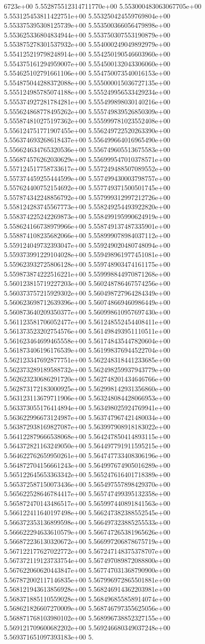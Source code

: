 6723e+00	5.552875512314711770e+00	5.553000483063067705e+00	5.553125453811422751e+00	5.553250424559769804e+00	5.553375395308125739e+00	5.553500366056479898e+00	5.553625336804834944e+00	5.553750307553190879e+00	5.553875278301537932e+00	5.554000249049892979e+00	5.554125219798248914e+00	5.554250190546603960e+00	5.554375161294959007e+00	5.554500132043306060e+00	5.554625102791661106e+00	5.554750073540016153e+00	5.554875044288372088e+00	5.555000015036727135e+00	5.555124985785074188e+00	5.555249956533429234e+00	5.555374927281784281e+00	5.555499898030140216e+00	5.555624868778495262e+00	5.555749839526850309e+00	5.555874810275197362e+00	5.555999781023552408e+00	5.556124751771907455e+00	5.556249722520263390e+00	5.556374693268618437e+00	5.556499664016965490e+00	5.556624634765320536e+00	5.556749605513675583e+00	5.556874576262030629e+00	5.556999547010378571e+00	5.557124517758733617e+00	5.557249488507089552e+00	5.557374459255444599e+00	5.557499430003798757e+00	5.557624400752154692e+00	5.557749371500501745e+00	5.557874342248856792e+00	5.557999312997212726e+00	5.558124283745567773e+00	5.558249254493922820e+00	5.558374225242269873e+00	5.558499195990624919e+00	5.558624166738979966e+00	5.558749137487335901e+00	5.558874108235682066e+00	5.558999078984037112e+00	5.559124049732393047e+00	5.559249020480748094e+00	5.559373991229104028e+00	5.559498961977451081e+00	5.559623932725806128e+00	5.559748903474161175e+00	5.559873874222516221e+00	5.559998844970871268e+00	5.560123815719227203e+00	5.560248786467574256e+00	5.560373757215929302e+00	5.560498727964284349e+00	5.560623698712639396e+00	5.560748669460986449e+00	5.560873640209350377e+00	5.560998610957697430e+00	5.561123581706052477e+00	5.561248552454408411e+00	5.561373523202754576e+00	5.561498493951110511e+00	5.561623464699465558e+00	5.561748435447820604e+00	5.561873406196176539e+00	5.561998376944522704e+00	5.562123347692877751e+00	5.562248318441233685e+00	5.562373289189588732e+00	5.562498259937943779e+00	5.562623230686291720e+00	5.562748201434646766e+00	5.562873172183000925e+00	5.562998142931356860e+00	5.563123113679711906e+00	5.563248084428066953e+00	5.563373055176414894e+00	5.563498025924769941e+00	5.563622996673124987e+00	5.563747967421480034e+00	5.563872938169827087e+00	5.563997908918183022e+00	5.564122879666538068e+00	5.564247850414893115e+00	5.564372821163249050e+00	5.564497791911595215e+00	5.564622762659950261e+00	5.564747733408306196e+00	5.564872704156661243e+00	5.564997674905016289e+00	5.565122645653363342e+00	5.565247616401718389e+00	5.565372587150073436e+00	5.565497557898429370e+00	5.565622528646784417e+00	5.565747499395132358e+00	5.565872470143486517e+00	5.565997440891841563e+00	5.566122411640197498e+00	5.566247382388552545e+00	5.566372353136899598e+00	5.566497323885255533e+00	5.566622294633610579e+00	5.566747265381965626e+00	5.566872236130320672e+00	5.566997206878675719e+00	5.567122177627022772e+00	5.567247148375378707e+00	5.567372119123733754e+00	5.567497089872088800e+00	5.567622060620443847e+00	5.567747031368790900e+00	5.567872002117146835e+00	5.567996972865501881e+00	5.568121943613856928e+00	5.568246914362203981e+00	5.568371885110559028e+00	5.568496855858914074e+00	5.568621826607270009e+00	5.568746797355625056e+00	5.568871768103980102e+00	5.568996738852327155e+00	5.569121709600682202e+00	5.569246680349037248e+00	5.569371651097393183e+00	5.